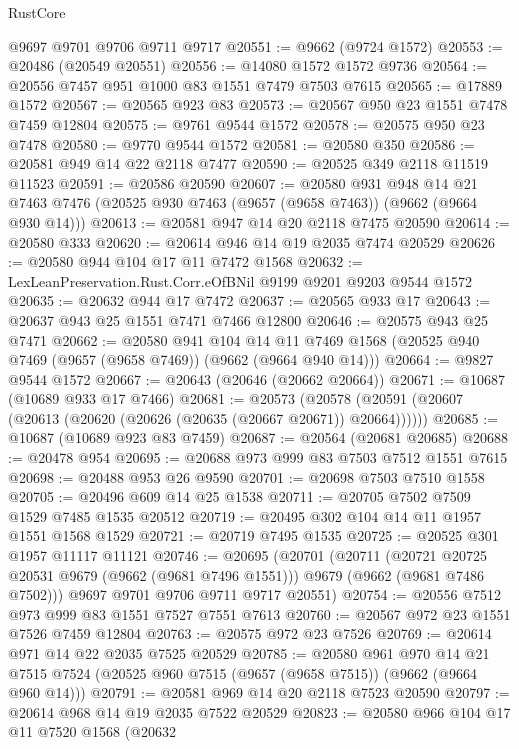 \begin{lexlean}{RustCore}
\begin{coremodule}
    @9697
    @9701
    @9706
    @9711
    @9717
@20551 := @9662 (@9724 @1572)
@20553 := @20486 (@20549 @20551)
@20556 := @14080 @1572 @1572 @9736
@20564 := @20556 @7457 @951 @1000 @83 @1551 @7479 @7503 @7615
@20565 := @17889 @1572
@20567 := @20565 @923 @83
@20573 := @20567 @950 @23 @1551 @7478 @7459 @12804
@20575 := @9761 @9544 @1572
@20578 := @20575 @950 @23 @7478
@20580 := @9770 @9544 @1572
@20581 := @20580 @350
@20586 := @20581 @949 @14 @22 @2118 @7477
@20590 := @20525 @349 @2118 @11519 @11523
@20591 := @20586 @20590
@20607 := @20580
    @931
    @948
    @14
    @21
    @7463
    @7476
    (@20525 @930 @7463 (@9657 (@9658 @7463)) (@9662 (@9664 @930 @14)))
@20613 := @20581 @947 @14 @20 @2118 @7475 @20590
@20614 := @20580 @333
@20620 := @20614 @946 @14 @19 @2035 @7474 @20529
@20626 := @20580 @944 @104 @17 @11 @7472 @1568
@20632 := LexLeanPreservation.Rust.Corr.eOfBNil @9199 @9201 @9203 @9544 @1572
@20635 := @20632 @944 @17 @7472
@20637 := @20565 @933 @17
@20643 := @20637 @943 @25 @1551 @7471 @7466 @12800
@20646 := @20575 @943 @25 @7471
@20662 := @20580
    @941
    @104
    @14
    @11
    @7469
    @1568
    (@20525 @940 @7469 (@9657 (@9658 @7469)) (@9662 (@9664 @940 @14)))
@20664 := @9827 @9544 @1572
@20667 := @20643 (@20646 (@20662 @20664))
@20671 := @10687 (@10689 @933 @17 @7466)
@20681 := @20573
    (@20578 (@20591 (@20607 (@20613 (@20620 (@20626 (@20635 (@20667 @20671)) @20664))))))
@20685 := @10687 (@10689 @923 @83 @7459)
@20687 := @20564 (@20681 @20685)
@20688 := @20478 @954
@20695 := @20688 @973 @999 @83 @7503 @7512 @1551 @7615
@20698 := @20488 @953 @26 @9590
@20701 := @20698 @7503 @7510 @1558
@20705 := @20496 @609 @14 @25 @1538
@20711 := @20705 @7502 @7509 @1529 @7485 @1535 @20512
@20719 := @20495 @302 @104 @14 @11 @1957 @1551 @1568 @1529
@20721 := @20719 @7495 @1535
@20725 := @20525 @301 @1957 @11117 @11121
@20746 := @20695
    (@20701
      (@20711
        (@20721 @20725 @20531 @9679 (@9662 (@9681 @7496 @1551)))
        @9679
        (@9662 (@9681 @7486 @7502)))
      @9697
      @9701
      @9706
      @9711
      @9717
      @20551)
@20754 := @20556 @7512 @973 @999 @83 @1551 @7527 @7551 @7613
@20760 := @20567 @972 @23 @1551 @7526 @7459 @12804
@20763 := @20575 @972 @23 @7526
@20769 := @20614 @971 @14 @22 @2035 @7525 @20529
@20785 := @20580
    @961
    @970
    @14
    @21
    @7515
    @7524
    (@20525 @960 @7515 (@9657 (@9658 @7515)) (@9662 (@9664 @960 @14)))
@20791 := @20581 @969 @14 @20 @2118 @7523 @20590
@20797 := @20614 @968 @14 @19 @2035 @7522 @20529
@20823 := @20580
    @966
    @104
    @17
    @11
    @7520
    @1568
    (@20632

\end{coremodule}
\end{lexlean}
